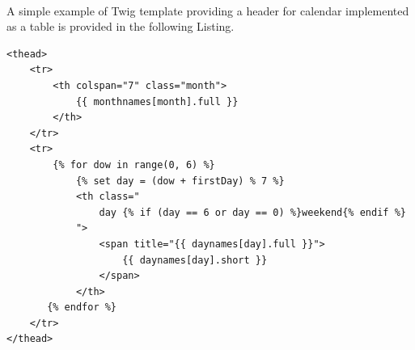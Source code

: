 \paragraph{} A simple example of Twig template providing a header for calendar implemented as a table is provided in the following Listing.

\begin{center}
\begin{lstlisting}[caption={Twig example},captionpos=b]
<thead>
	<tr>
		<th colspan="7" class="month">
			{{ monthnames[month].full }}
        </th>
    </tr>
    <tr>
        {% for dow in range(0, 6) %}
        	{% set day = (dow + firstDay) % 7 %}
            <th class="
            	day {% if (day == 6 or day == 0) %}weekend{% endif %}
            ">
            	<span title="{{ daynames[day].full }}">
            		{{ daynames[day].short }}
            	</span>
            </th>
       {% endfor %}
	</tr>
</thead>
\end{lstlisting}
\end{center}


